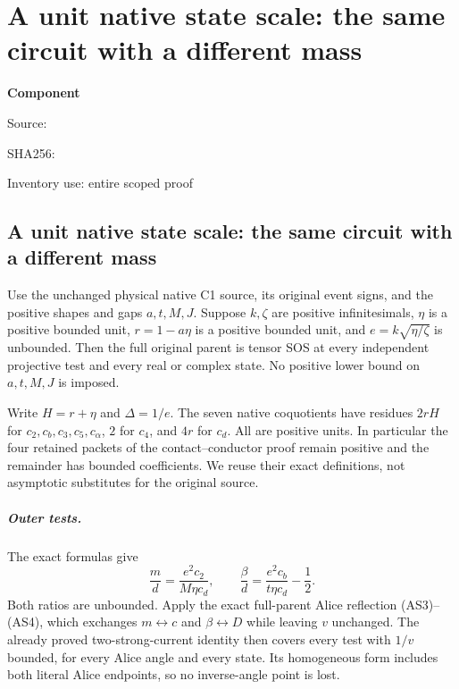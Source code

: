 \chapter{A unit native state scale: the same circuit with a different mass}
\label{component:p890eea5f538b}
\noindent\textbf{Component }\par
{\small\noindent Source: \par}
{\small\noindent SHA256: \par}
{\small\noindent Inventory use: entire scoped proof\par}
\medskip
\section{A unit native state scale: the same circuit with a different mass}

\begin{theorem}
Use the unchanged physical native C1 source, its original event signs,
and the positive shapes and gaps $a,t,M,J$. Suppose $k,\zeta$ are
positive infinitesimals, $\eta$ is a positive bounded unit,
$r=1-a\eta$ is a positive bounded unit, and $e=k\sqrt{\eta/\zeta}$
is unbounded. Then the full original parent is tensor SOS at every
independent projective test and every real or complex state.
No positive lower bound on $a,t,M,J$ is imposed.
\end{theorem}

Write $H=r+\eta$ and $\Delta=1/e$. The seven native coquotients
have residues $2rH$ for $c_2,c_b,c_3,c_5,c_\alpha$, $2$ for
$c_4$, and $4r$ for $c_d$. All are positive units. In particular the
four retained packets of the contact--conductor proof remain positive
and the remainder has bounded coefficients. We reuse their exact
definitions, not asymptotic substitutes for the original source.

\paragraph{Outer tests.}
The exact formulas give
\[
 \frac md=\frac{e^2c_2}{M\eta c_d},\qquad
 \frac\beta d=\frac{e^2c_b}{t\eta c_d}-\frac12.
\]
Both ratios are unbounded. Apply the exact full-parent Alice reflection
(AS3)--(AS4), which exchanges $m\leftrightarrow c$ and
$\beta\leftrightarrow D$ while leaving $v$ unchanged. The already
proved two-strong-current identity then covers every test with $1/v$
bounded, for every Alice angle and every state. Its homogeneous form
includes both literal Alice endpoints, so no inverse-angle point is lost.

